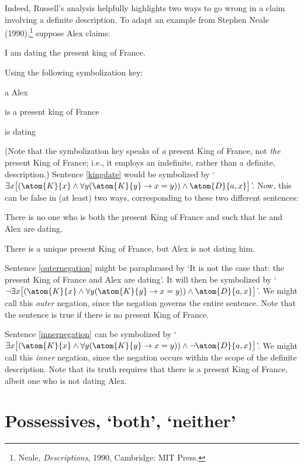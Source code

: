 Indeed, Russell's analysis helpfully highlights two ways to go wrong in a claim involving a definite description. To adapt an example from Stephen Neale (1990),\footnote{Neale, \emph{Descriptions}, 1990, Cambridge: MIT Press.} suppose Alex claims:
	\begin{earg}
		\item[\ex{kingdate}] I am dating the present king of France.
	\end{earg}
Using the following symbolization key:
	\begin{ekey}
		\item[a] Alex
		\item[\atom{K}{x}]  is a present king of France
		\item[\atom{D}{x,y}]  is dating 
	\end{ekey}
	(Note that the symbolization key speaks of \emph{a} present King of France, not \emph{the} present King of France; i.e., it employs an indefinite, rather than a definite, description.) Sentence \ref{kingdate} would be symbolized by `$\exists x \bigl[(\atom{K}{x} \eand \forall y(\atom{K}{y} \eif  x = y)) \eand \atom{D}{a,x}\bigr]$'. Now, this can be false in (at least) two ways, corresponding to these two different sentences:
	\begin{earg}
		\item[\ex{outernegation}] There is no one who is both the present King of France and such that he and Alex are dating.
		\item[\ex{innernegation}] There is a unique present King of France, but Alex is not dating him.
	\end{earg}
Sentence \ref{outernegation} might be paraphrased by `It is not the case that: the present King of France and Alex are dating'. It will then be symbolized by `$\enot \exists x\bigl[(\atom{K}{x} \eand \forall y(\atom{K}{y} \eif  x = y)) \eand \atom{D}{a,x} \bigr]$'. We might call this \emph{outer} negation, since the negation governs the entire sentence. Note that the sentence is true if there is no present King of France.

Sentence \ref{innernegation} can be symbolized by `$\exists x \bigl[(\atom{K}{x} \eand \forall y(\atom{K}{y} \eif x = y)) \eand \enot \atom{D}{a,x}\bigr]$'. We might call this \emph{inner} negation, since the negation occurs within the scope of the definite description. Note that its truth requires that there is a present King of France, albeit one who is not dating Alex.

\section{Possessives, `both', `neither'}

